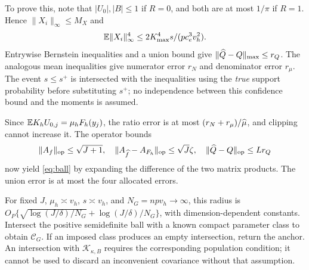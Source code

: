 To prove this, note that $|U_0|,|B|\leq1$ if $R=0$, and both are at most $1/\pi$ if $R=1$. Hence $\|X_i\|_\infty\leq M_X$ and
\[
 \mathbb E\|X_i\|_\infty^4\leq2K_{\max}^4s/(pc_e^3v_h^2).
\]
Entrywise Bernstein inequalities and a union bound give $\|\widehat Q-Q\|_{\max}\leq r_Q$. The analogous mean inequalities give numerator error $r_N$ and denominator error $r_\mu$. The event $s\leq s^+$ is intersected with the inequalities using the \emph{true} support probability before substituting $s^+$; no independence between this confidence bound and the moments is assumed.

Since $\mathbb E K_hU_{0,j}=\mu_h F_h(y_j)$, the ratio error is at most $(r_N+r_\mu)/\widehat\mu$, and clipping cannot increase it. The operator bounds
\[
 \|A_f\|_{\mathrm{op}}\leq\sqrt{J+1},\quad
 \|A_{\widehat f}-A_{F_h}\|_{\mathrm{op}}\leq\sqrt J\zeta,\quad
 \|\widehat Q-Q\|_{\mathrm{op}}\leq Lr_Q
\]
now yield \eqref{eq:ball} by expanding the difference of the two matrix products. The union error is at most the four allocated errors.

For fixed $J$, $\mu_h\asymp v_h$, $s\asymp v_h$, and $N_G=npv_h\to\infty$, this radius is
$O_P\{\sqrt{\log(J/\delta)/N_G}+\log(J/\delta)/N_G\}$, with dimension-dependent constants. Intersect the positive semidefinite ball with a known compact parameter class to obtain $\mathcal C_G$. If an imposed class produces an empty intersection, return the anchor. An intersection with $\mathcal K_{\kappa,B}$ requires the corresponding population condition; it cannot be used to discard an inconvenient covariance without that assumption.

